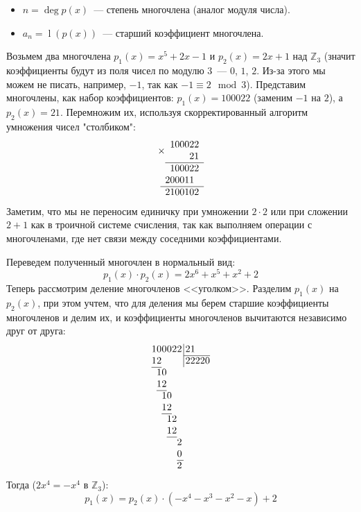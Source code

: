 \documentclass[russian]{lecture-notes}
\theoremstyle{definition}
\DeclareMathOperator{\Lid}{l}
\newcommand{\lid}[1]{\Lid(#1)}
\begin{document}
	\begin{itemize}
		\item $n=\deg{p(x)}$~--- степень многочлена (аналог модуля числа).
		\item $a_n = \lid{p(x)}$~--- старший коэффициент многочлена.
	\end{itemize}

	\begin{example}
		Возьмем два многочлена $p_1(x) = x^5 + 2x - 1$ и $p_2(x) = 2x + 1$ над $\mathbb{Z}_3$ (значит коэффициенты будут из поля чисел по модулю $3$~--- $0$, $1$, $2$. Из-за этого мы можем не писать, например, $-1$, так как $-1 \equiv 2 \mod 3$). Представим многочлены, как набор коэффициентов: $p_1(x) = 100022$ (заменим $-1$ на $2$), а $p_2(x) = 21$. Перемножим их, используя скорректированный алгоритм умножения чисел "столбиком":
		\[
			\begin{array}{r}
				\times
				\begin{array}{r}
					100022 \\
					21 \\
					\hline
				\end{array} \\
				\begin{array}{r}
					100022 \\
					200011\phantom{0} \\
					\hline
					2100102
				\end{array}	
			\end{array}
		\]
		Заметим, что мы не переносим единичку при умножении $2 \cdot 2$ или при сложении $2 + 1$ как в троичной системе счисления, так как выполняем операции с многочленами, где нет связи между соседними коэффициентами. 
		
		\noindent Переведем полученный многочлен в нормальный вид:
		\[
		p_1(x) \cdot p_2(x) = 2x^6 + x^5 + x^2 + 2
		\]
		Теперь рассмотрим деление многочленов <<уголком>>. Разделим $p_1(x)$ на $p_2(x)$, при этом учтем, что для деления мы берем старшие коэффициенты многочленов и делим их, и коэффициенты многочленов вычитаются независимо друг от друга:
		\[
			\arraycolsep=0.01em
			\begin{array}{rrrrrr@{\,}r|l}
			1&0&0&0&2&2&&\,21\\
			\cline{8-8}
			1&2&&&&&&\,22220\\
			\cline{1-2}
			&1&0&&&\\
			&1&2&&&\\
			\cline{2-3}
			&&1&0&&\\
			&&1&2&&\\
			\cline{3-4}
			&&&1&2&\\
			&&&1&2&\\
			\cline{4-5}
			&&&&&2\\
			&&&&&0\\
			\cline{6-6}
			&&&&&2
			\end{array}
		\]
		Тогда ($2x^4 = -x^4$ в $\mathbb{Z}_3$):
		\[
			p_1(x) = p_2(x) \cdot (-x^4 - x^3 - x^2 - x) + 2
		\]
		
	\end{example}
\end{document}
